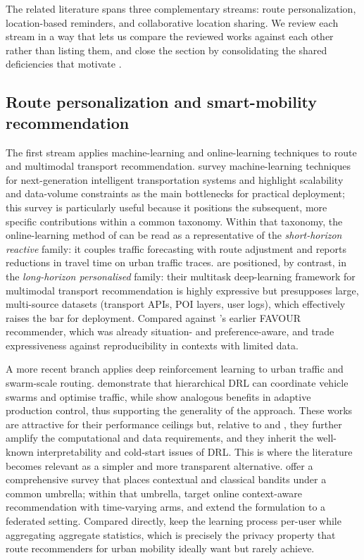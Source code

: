 \documentclass[a4paper,fleqn]{cas-sc}
\begin{document}
	The related literature spans three complementary streams: route personalization, location-based reminders, and collaborative location sharing. We review each stream in a way that lets us compare the reviewed works against each other rather than listing them, and close the section by consolidating the shared deficiencies that motivate \RUTAI{}.
	
	\subsection{Route personalization and smart-mobility recommendation}\label{sec:rw-routes}
	
	The first stream applies machine-learning and online-learning techniques to route and multimodal transport recommendation. \citet{yuan2022mlits} survey machine-learning techniques for next-generation intelligent transportation systems and highlight scalability and data-volume constraints as the main bottlenecks for practical deployment; this survey is particularly useful because it positions the subsequent, more specific contributions within a common taxonomy. Within that taxonomy, the online-learning method of \citet{guo2021online} can be read as a representative of the \emph{short-horizon reactive} family: it couples traffic forecasting with route adjustment and reports reductions in travel time on urban traffic traces. \citet{liu2022multimodal} are positioned, by contrast, in the \emph{long-horizon personalised} family: their multitask deep-learning framework for multimodal transport recommendation is highly expressive but presupposes large, multi-source datasets (transport APIs, POI layers, user logs), which effectively raises the bar for deployment. Compared against \citet{campigotto2017favour}'s earlier FAVOUR recommender, which was already situation- and preference-aware, \citet{liu2022multimodal} and \citet{guo2021online} trade expressiveness against reproducibility in contexts with limited data.
	
	A more recent branch applies deep reinforcement learning to urban traffic and swarm-scale routing. \citet{zhang2025drlnavigation} demonstrate that hierarchical DRL can coordinate vehicle swarms and optimise traffic, while \citet{kuhnle2021rl} show analogous benefits in adaptive production control, thus supporting the generality of the approach. These works are attractive for their performance ceilings but, relative to \citet{campigotto2017favour} and \citet{guo2021online}, they further amplify the computational and data requirements, and they inherit the well-known interpretability and cold-start issues of DRL. This is where the \MAB{} literature becomes relevant as a simpler and more transparent alternative. \citet{bouneffouf2020mabsurvey} offer a comprehensive survey that places contextual and classical bandits under a common umbrella; within that umbrella, \citet{zeng2016mab} target online context-aware recommendation with time-varying arms, and \citet{shi2021fedmab} extend the formulation to a federated setting. Compared directly, \citet{shi2021fedmab} keep the learning process per-user while aggregating aggregate statistics, which is precisely the privacy property that route recommenders for urban mobility ideally want but rarely achieve.
	
\end{document}
